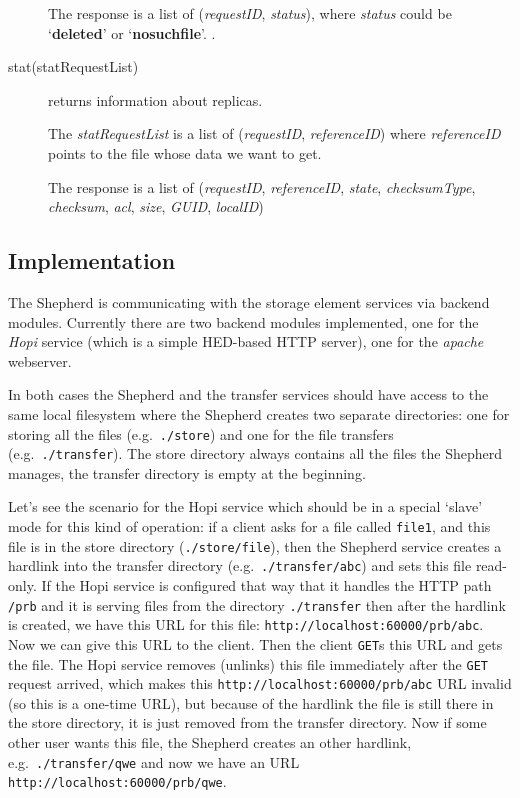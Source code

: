 \documentclass{book}
\begin{document}
\begin{description}
    The response is a list of (\emph{requestID}, \emph{status}), where \emph{status} could be `\textbf{deleted}' or `\textbf{nosuchfile}'.
    .
    \item[stat(statRequestList)] returns information about replicas.

    The \emph{statRequestList} is a list of (\emph{requestID}, \emph{referenceID}) where \emph{referenceID} points to the file whose data we want to get. 
    
    The response is a list of (\emph{requestID}, \emph{referenceID}, \emph{state}, \emph{checksumType}, \emph{checksum}, \emph{acl}, \emph{size}, \emph{GUID}, \emph{localID})    
\end{description}


\subsection{Implementation} %
\label{sub:shepherd_implementation}

The Shepherd is communicating with the storage element services via backend modules. Currently there are two backend modules implemented, one for the \emph{Hopi} service (which is a simple HED-based HTTP server), one for the \emph{apache} webserver.

In both cases the Shepherd and the transfer services should have access to the same local filesystem where the Shepherd creates two separate directories: one for storing all the files (e.g.~\verb!./store!) and one for the file transfers (e.g.~\verb!./transfer!). The store directory always contains all the files the Shepherd manages, the transfer directory is empty at the beginning.

Let's see the scenario for the Hopi service which should be in a special `slave' mode for this kind of operation: if a client asks for a file called \verb!file1!, and this file is in the store directory (\verb!./store/file!), then the Shepherd service creates a hardlink into the transfer directory (e.g.~\verb!./transfer/abc!) and sets this file read-only. If the Hopi service is configured that way that it handles the HTTP path \verb!/prb! and it is serving files from the directory \verb!./transfer! then after the hardlink is created, we have this URL for this file: \verb!http://localhost:60000/prb/abc!. Now we can give this URL to the client. Then the client \verb!GET!s this URL and gets the file. The Hopi service removes (unlinks) this file immediately after the \verb!GET! request arrived, which makes this \verb!http://localhost:60000/prb/abc! URL invalid (so this is a one-time URL), but because of the hardlink the file is still there in the store directory, it is just removed from the transfer directory. Now if some other user wants this file, the Shepherd creates an other hardlink, e.g.~\verb!./transfer/qwe! and now we have an URL \verb!http://localhost:60000/prb/qwe!.
\end{document}
